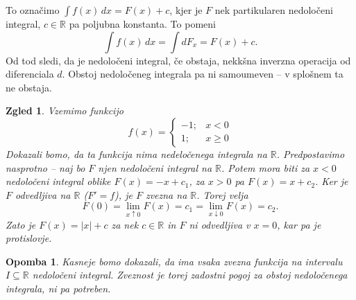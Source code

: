 \documentclass[10pt, a4paper]{article}
\newtheorem*{opomba}{Opomba}
\newtheorem{zgled}{Zgled}[section]
\newcommand{\R}{\mathbb {R}}
\newcommand{\rlimf}[3]{\lim_{#1 \downarrow #2} {#3}}
\newcommand{\llimf}[3]{\lim_{#1 \uparrow #2} {#3}}
\begin{document}
To označimo $\int f(x)\,dx = F(x) + c$, kjer je $F$ nek partikularen nedoločeni integral, $c \in \R$ pa poljubna konstanta.
To pomeni $$\int f(x)\,dx = \int dF_x = F(x) + c.$$
Od tod sledi, da je nedoločeni integral, če obstaja, nekkšna inverzna operacija od diferenciala $d$.
Obstoj nedoločeneg integrala pa ni samoumeven -- v splošnem ta ne obstaja.

\begin{zgled}
    Vzemimo funkcijo $$f(x) = \begin{cases}
        -1 ;& x < 0\\
        1 ;& x \geq 0
    \end{cases}$$
    Dokazali bomo, da ta funkcija nima nedeločenega integrala na $\R$.
    Predpostavimo nasprotno -- naj bo $F$ njen nedoločeni integral na $\R$.
    Potem mora biti za $x<0$ nedoločeni integral oblike $F(x) = - x + c_1$, za $x > 0$ pa $F(x) = x + c_2$.
    Ker je $F$ odvedljiva na $\R$ ($F' = f$), je $F$ zvezna na $\R$.
    Torej velja $$F(0) = \llimf{x}{0}{F(x)} = c_1 = \rlimf{x}{0}{F(x)} = c_2.$$
    Zato je $F(x) = |x| + c$ za nek $c \in \R$ in $F$ ni odvedljiva v $x = 0$, kar pa je protislovje.
\end{zgled}

\begin{opomba}
    Kasneje bomo dokazali, da ima vsaka zvezna funkcija na intervalu $I \subseteq \R$ nedoločeni integral.
    Zveznost je torej zadostni pogoj za obstoj nedoločenega integrala, ni pa potreben.
\end{opomba}
\end{document}
